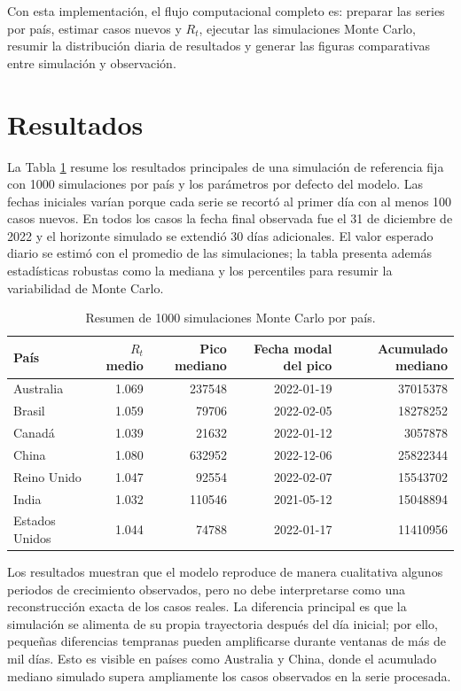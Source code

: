 \documentclass[12pt]{article}
\begin{document}
Con esta implementación, el flujo computacional completo es: preparar las
series por país, estimar casos nuevos y \(R_t\), ejecutar las simulaciones
Monte Carlo, resumir la distribución diaria de resultados y generar las
figuras comparativas entre simulación y observación.

\section{Resultados}

La Tabla \ref{tab:simulation-results} resume los resultados principales de una
simulación de referencia fija con 1000 simulaciones por país y los parámetros por
defecto del modelo. Las fechas iniciales varían porque cada serie se recortó al
primer día con al menos 100 casos nuevos. En todos los casos la fecha final
observada fue el 31 de diciembre de 2022 y el horizonte simulado se extendió 30
días adicionales. El valor esperado diario se estimó con el promedio de las
simulaciones; la tabla presenta además estadísticas robustas como la mediana y
los percentiles para resumir la variabilidad de Monte Carlo.

\begin{table}[htbp]
  \centering
  \small
  \begin{tabular}{lrrrr}
    \hline
    País & \(R_t\) medio & Pico mediano & Fecha modal del pico
    & Acumulado mediano \\
    \hline
    Australia & 1.069 & 237548 & 2022-01-19 & 37015378 \\
    Brasil & 1.059 & 79706 & 2022-02-05 & 18278252 \\
    Canadá & 1.039 & 21632 & 2022-01-12 & 3057878 \\
    China & 1.080 & 632952 & 2022-12-06 & 25822344 \\
    Reino Unido & 1.047 & 92554 & 2022-02-07 & 15543702 \\
    India & 1.032 & 110546 & 2021-05-12 & 15048894 \\
    Estados Unidos & 1.044 & 74788 & 2022-01-17 & 11410956 \\
    \hline
  \end{tabular}
  \caption{Resumen de 1000 simulaciones Monte Carlo por país.}
  \label{tab:simulation-results}
\end{table}

Los resultados muestran que el modelo reproduce de manera cualitativa algunos
periodos de crecimiento observados, pero no debe interpretarse como una
reconstrucción exacta de los casos reales. La diferencia principal es que la
simulación se alimenta de su propia trayectoria después del día inicial; por
ello, pequeñas diferencias tempranas pueden amplificarse durante ventanas de
más de mil días. Esto es visible en países como Australia y China, donde el
acumulado mediano simulado supera ampliamente los casos observados en la serie
procesada.
\end{document}
